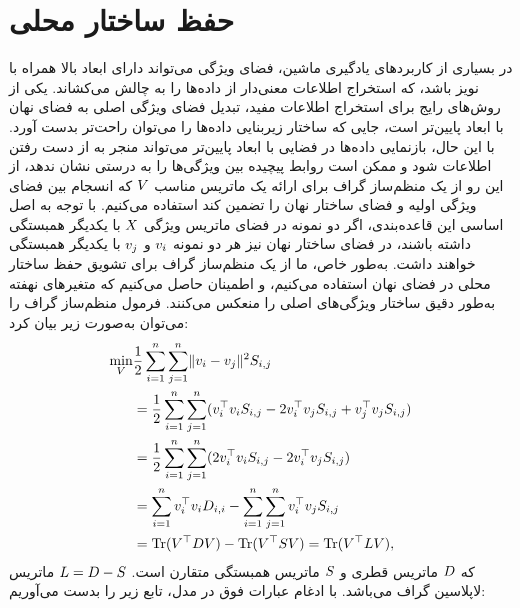 \section{حفظ ساختار محلی}\label{LS}
در بسیاری از کاربرد‌های یادگیری ماشین، فضای ویژگی می‌تواند دارای ابعاد بالا همراه با نویز باشد، که استخراج اطلاعات معنی‌دار از داده‌ها را به چالش می‌کشاند. یکی از روش‌های رایج برای استخراج اطلاعات مفید، تبدیل فضای ویژگی اصلی به فضای نهان با ابعاد پایین‌تر است، جایی که ساختار زیربنایی داده‌ها را می‌توان راحت‌تر بدست ‌آورد. با این حال، بازنمایی داده‌ها در فضایی با ابعاد پایین‌تر می‌تواند منجر به از دست رفتن اطلاعات شود و ممکن است روابط پیچیده بین ویژگی‌ها را به درستی نشان ندهد، از این رو از  یک منظم‌ساز گراف \cite{cai2010graph} برای ارائه یک ماتریس مناسب $\boldmath{V}$ که انسجام بین فضای ویژگی اولیه و فضای ساختار نهان را تضمین ‌کند استفاده می‌کنیم. با توجه به اصل اساسی این قاعده‌بندی، اگر دو نمونه در فضای ماتریس ویژگی $\boldmath{X}$ با یکدیگر همبستگی داشته باشند، در فضای ساختار نهان نیز هر دو نمونه $\boldmath{v}_i$ و $\boldmath{v}_j$ با یکدیگر همبستگی خواهند داشت. به‌طور خاص، ما از یک منظم‌ساز گراف برای تشویق حفظ ساختار محلی در فضای نهان استفاده می‌کنیم، و اطمینان حاصل می‌کنیم که متغیرهای نهفته به‌طور دقیق ساختار ویژگی‌های اصلی را منعکس می‌کنند. فرمول منظم‌ساز گراف را می‌توان به‌صورت زیر بیان کرد:
\begin{align} \label{eq:mfold}
	\min_{\boldmath{V}}&\frac{1}{2}\sum_{i=1}^n\sum_{j=1}^n\lVert\boldmath{v}_i-\boldmath{v}_j\rVert^2S_{i,j}\nonumber\\
	&=\frac{1}{2}\sum_{i=1}^n\sum_{j=1}^n(\boldmath{v}_i^\top\boldmath{v}_iS_{i,j}-2\boldmath{v}_i^\top\boldmath{v}_jS_{i,j}+\boldmath{v}_j^\top\boldmath{v}_jS_{i,j})\nonumber\\
	&=\frac{1}{2}\sum_{i=1}^n\sum_{j=1}^n(2\boldmath{v}_i^\top\boldmath{v}_iS_{i,j}-2\boldmath{v}_i^\top\boldmath{v}_jS_{i,j})\nonumber\\
	&=\sum_{i=1}^n\boldmath{v}_i^\top\boldmath{v}_iD_{i,i}-\sum_{i=1}^n\sum_{j=1}^n\boldmath{v}_i^\top\boldmath{v}_jS_{i,j}\nonumber\\
	&=\mathrm{Tr}(\boldmath{V}^\top\boldmath{DV})-\mathrm{Tr}(\boldmath{V}^\top\boldmath{SV})=\mathrm{Tr}(\boldmath{V}^\top \boldmath{LV}),
\end{align}
که
$\boldmath{D}$ ماتریس قطری و $\boldmath{S}$ ماتریس همبستگی متقارن است. $\boldmath{L} = \boldmath{D} - \boldmath{S}$ ماتریس لاپلاسین گراف می‌باشد. با ادغام عبارات فوق در مدل، تابع زیر را بدست می‌آوریم:

